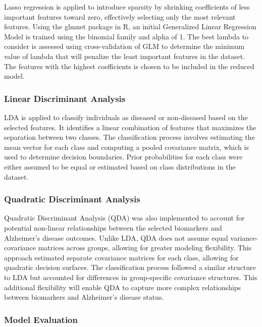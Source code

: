 \documentclass[12pt]{article}
\begin{document}
Lasso regression is applied to introduce sparsity by shrinking coefficients of less important features toward zero, effectively selecting only the most relevant features. Using the glmnet package in R, an initial Generalized Linear Regression Model
is trained using the binomial family and alpha of 1. The best lambda to consider is assessed using cross-validation of GLM to determine the minimum value of lambda that will penalize the least important features in the dataset. The features with the highest 
coefficients is chosen to be included in the reduced model. 

\subsubsection{Linear Discriminant Analysis}
\noindent

LDA is applied to classify individuals as diseased or non-diseased based on the selected features. It identifies a linear combination of features that maximizes the separation between two classes. The classification process involves estimating the mean vector 
for each class and computing a pooled covariance matrix, which is used to determine decision boundaries. Prior probabilities for each class were either assumed to be equal or estimated based on class distributions in the dataset. 

\subsubsection{Quadratic Discriminant Analysis}
\noindent

Quadratic Discriminant Analysis (QDA) was also implemented to account for potential non-linear relationships between the selected biomarkers and Alzheimer’s disease outcomes. Unlike LDA, QDA does not assume equal variance-covariance matrices across groups, 
allowing for greater modeling flexibility. This approach estimated separate covariance matrices for each class, allowing for quadratic decision surfaces. The classification process followed a similar structure to LDA but accounted for differences in group-specific 
covariance structures. This additional flexibility will enable QDA to capture more complex relationships between biomarkers and Alzheimer’s disease status.

\subsubsection{Model Evaluation}
\noindent
\end{document}
